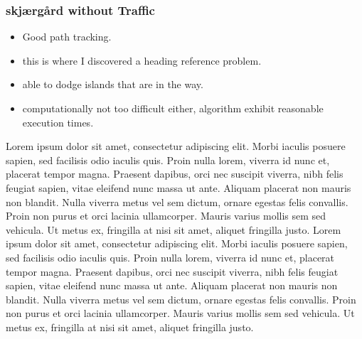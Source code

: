 \subsubsection{skjærgård without Traffic}
\begin{itemize}
    \item Good path tracking.
    \item this is where I discovered a heading reference problem.
    \item able to dodge islands that are in the way.
    \item computationally not too difficult either, algorithm exhibit reasonable execution times.
\end{itemize}
Lorem ipsum dolor sit amet, consectetur adipiscing elit. Morbi iaculis posuere sapien, sed facilisis odio iaculis quis. 
Proin nulla lorem, viverra id nunc et, placerat tempor magna. Praesent dapibus, orci nec suscipit viverra, nibh felis feugiat sapien, 
vitae eleifend nunc massa ut ante. Aliquam placerat non mauris non blandit. Nulla viverra metus vel sem dictum, ornare egestas felis convallis. 
Proin non purus et orci lacinia ullamcorper. Mauris varius mollis sem sed vehicula. Ut metus ex, fringilla at nisi sit amet, aliquet fringilla justo.
Lorem ipsum dolor sit amet, consectetur adipiscing elit. Morbi iaculis posuere sapien, sed facilisis odio iaculis quis. 
Proin nulla lorem, viverra id nunc et, placerat tempor magna. Praesent dapibus, orci nec suscipit viverra, nibh felis feugiat sapien, 
vitae eleifend nunc massa ut ante. Aliquam placerat non mauris non blandit. Nulla viverra metus vel sem dictum, ornare egestas felis convallis. 
Proin non purus et orci lacinia ullamcorper. Mauris varius mollis sem sed vehicula. Ut metus ex, fringilla at nisi sit amet, aliquet fringilla justo.

